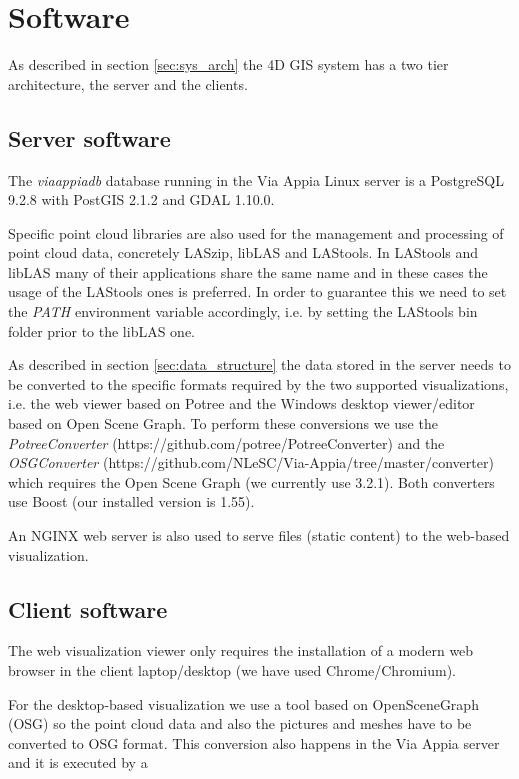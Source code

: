 \newpage
\section{Software}
\label{sec:software}
As described in section \ref{sec:sys_arch} the 4D GIS system has a two tier
architecture, the server and the clients. 

\subsection{Server software}
The \textit{viaappiadb} database running in the Via Appia Linux server is a
PostgreSQL 9.2.8 with PostGIS 2.1.2 and GDAL 1.10.0.

Specific point cloud libraries are also used for the management and processing
of point cloud data, concretely LASzip, libLAS and LAStools. In LAStools and
libLAS many of their applications share the same name and in these cases the
usage of the LAStools ones is preferred. In order to guarantee this we need to
set the \textit{PATH} environment variable accordingly, i.e. by setting the
LAStools bin folder prior to the libLAS one.

As described in section \ref{sec:data_structure} the data stored in the server
needs to be converted to the specific formats required by the two supported
visualizations, i.e. the web viewer based on Potree and the Windows desktop
viewer/editor based on Open Scene Graph. To perform these conversions we use
the \textit{PotreeConverter} (https://github.com/potree/PotreeConverter) and
the \textit{OSGConverter}
(https://github.com/NLeSC/Via-Appia/tree/master/converter) which requires the
Open Scene Graph (we currently use 3.2.1). Both converters use Boost (our
installed version is 1.55).

An NGINX web server is also used to serve files (static content) to the
web-based visualization. 

\subsection{Client software}
The web visualization viewer only requires the installation of a modern web
browser in the client laptop/desktop (we have used Chrome/Chromium).

For the desktop-based visualization we use a tool based on OpenSceneGraph (OSG)
so the point cloud data and also the pictures and meshes have to be converted
to OSG format. This conversion also happens in the Via Appia server and it is
executed by a

